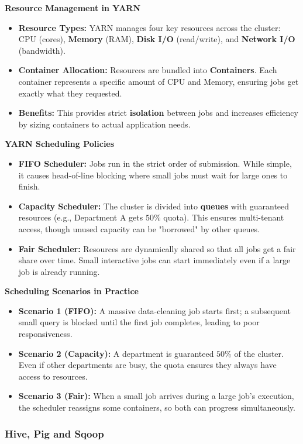 \textbf{Resource Management in YARN}\begin{itemize}\item \textbf{Resource Types:} YARN manages four key resources across the cluster: $\text{CPU}$ (cores), \textbf{Memory} (RAM), \textbf{Disk I/O} (read/write), and \textbf{Network I/O} (bandwidth).\item \textbf{Container Allocation:} Resources are bundled into \textbf{Containers}. Each container represents a specific amount of $\text{CPU}$ and Memory, ensuring jobs get exactly what they requested.\item \textbf{Benefits:} This provides strict \textbf{isolation} between jobs and increases efficiency by sizing containers to actual application needs.\end{itemize}\textbf{ YARN Scheduling Policies}\begin{itemize}\item \textbf{FIFO Scheduler:} Jobs run in the strict order of submission. While simple, it causes head-of-line blocking where small jobs must wait for large ones to finish.\item \textbf{Capacity Scheduler:} The cluster is divided into \textbf{queues} with guaranteed resources (e.g., Department A gets $50\%$ quota). This ensures multi-tenant access, though unused capacity can be "borrowed" by other queues.\item \textbf{Fair Scheduler:} Resources are dynamically shared so that all jobs get a fair share over time. Small interactive jobs can start immediately even if a large job is already running.\end{itemize}\textbf{ Scheduling Scenarios in Practice}\begin{itemize}\item \textbf{Scenario 1 (FIFO):} A massive data-cleaning job starts first; a subsequent small query is blocked until the first job completes, leading to poor responsiveness.\item \textbf{Scenario 2 (Capacity):} A department is guaranteed $50\%$ of the cluster. Even if other departments are busy, the quota ensures they always have access to resources.\item \textbf{Scenario 3 (Fair):} When a small job arrives during a large job's execution, the scheduler reassigns some containers, so both can progress simultaneously.\end{itemize}

\subsubsection{Hive, Pig and Sqoop}


